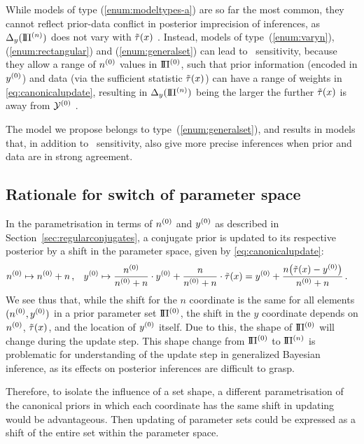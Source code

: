 While models of type (\ref{enum:modeltypes-a}) are so far the most common,
they cannot reflect prior-data conflict in posterior imprecision of inferences,
as $\Delta_y(\text{I}\!\Pi^{(n)})$ does not vary with $\tilde{\tau}(x)$ \cite[Eq. (3.4), p.~64]{diss-gw}.
Instead, models of type~(\ref{enum:varyn}), (\ref{enum:rectangular}) and (\ref{enum:generalset}) can lead to \pdc\ sensitivity,
because they allow a range of $n^{(0)}$ values in $\text{I}\!\Pi^{(0)}$,
such that prior information (encoded in $y^{(0)}$) and data (via the sufficient statistic $\tilde{\tau}(x)$)
can have a range of weights in \eqref{eq:canonicalupdate},
resulting in $\Delta_y(\text{I}\!\Pi^{(n)})$ being the larger the further $\tilde{\tau}(x)$ is away from $\mathcal{Y}^{(0)}$
\cite[\S 3.1.4]{diss-gw}.

The model we propose belongs to type~(\ref{enum:generalset}),
and results in models that, in addition to \pdc\ sensitivity,
also give more precise inferences when prior and data are in strong agreement.


\subsection{Rationale for switch of parameter space}
\label{sec:rationale-for-miks-world}

In the parametrisation in terms of $n^{(0)}$ and $y^{(0)}$ as described in Section~\ref{sec:regularconjugates},
a conjugate prior is updated to its respective posterior by a shift in the parameter space,
given by \eqref{eq:canonicalupdate}:
\begin{align*}
n^{(0)} &\mapsto n^{(0)} + n\,, &
y^{(0)} &\mapsto \frac{n^{(0)}}{n^{(0)} + n} \cdot y^{(0)} + \frac{n}{n^{(0)} + n} \cdot \tilde{\tau}(x) = y^{(0)} + \frac{n \big(\tilde{\tau}(x)-y^{(0)}\big)}{n^{(0)}+n}\,.
\end{align*}
We see thus that, while the shift for the $n$ coordinate is the same for all elements $(n^{(0)},y^{(0)})$
in a prior parameter set $\text{I}\!\Pi^{(0)}$,
the shift in the $y$ coordinate depends on $n^{(0)}$, $\tilde{\tau}(x)$, and the location of $y^{(0)}$ itself.
Due to this, the shape of $\text{I}\!\Pi^{(0)}$ will change during the update step.
This shape change from $\text{I}\!\Pi^{(0)}$ to $\text{I}\!\Pi^{(n)}$ is problematic for understanding of the update step in generalized Bayesian inference,
as its effects on posterior inferences are difficult to grasp.

Therefore, to isolate the influence of a set shape,
a different parametrisation of the canonical priors
in which each coordinate has the same shift in updating
would be advantageous.
Then updating of parameter sets
could be expressed as a shift of the entire set within the parameter space.

